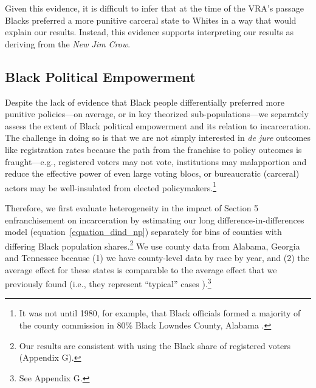\documentclass[12pt]{article}
\begin{document}
Given this evidence, it is difficult to infer that at the time of the VRA's passage Blacks preferred a more punitive carceral state to Whites in a way that would explain our results. Instead, this evidence supports interpreting our results as deriving from the \emph{New Jim Crow}.


\subsection*{Black Political Empowerment}\label{section_blackpoliticalempowerment}

Despite the lack of evidence that Black people differentially preferred more punitive policies---on average, or in key theorized sub-populations---we separately assess the extent of Black political empowerment and its relation to incarceration. The challenge in doing so is that we are not simply interested in \emph{de jure} outcomes like registration rates because the path from the franchise to policy outcomes is fraught---e.g., registered voters may not vote, institutions may malapportion and reduce the effective power of even large voting blocs, or bureaucratic (carceral) actors may be well-insulated from elected policymakers.\footnote{It was not until 1980, for example, that Black officials formed a majority of the county commission in 80\% Black Lowndes County, Alabama \citep{Jeffries:2009wq}.}


Therefore, we first evaluate heterogeneity in the impact of Section 5 enfranchisement on incarceration by estimating our long difference-in-differences model (equation~\ref{equation_dind_np}) separately for bins of counties with differing Black population shares.\footnote{Our results are consistent with using the Black share of registered voters (Appendix G).} We use county data from Alabama, Georgia and Tennessee because (1) we have county-level data by race by year, and (2) the average effect for these states is comparable to the average effect that we previously found (i.e., they represent ``typical'' cases \citep{Seawright:2008us}).\footnote{See Appendix G.}
\end{document}

